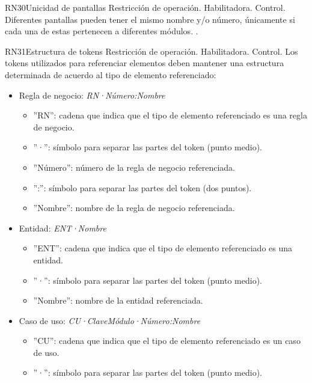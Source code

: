 \begin{BussinesRule}{RN30}{Unicidad de pantallas} 
	\BRitem[Tipo:] Restricción de operación. 
	\BRitem[Clase:] Habilitadora. 
	\BRitem[Nivel:] Control. %
	\BRitem[Descripción:] Diferentes pantallas pueden tener el mismo nombre y/o número, únicamente si cada una de estas pertenecen a diferentes módulos.
	 \UCref{}{}. 
\end{BussinesRule}

\begin{BussinesRule}{RN31}{Estructura de tokens} 
	\BRitem[Tipo:] Restricción de operación. 
	\BRitem[Clase:] Habilitadora. 
	\BRitem[Nivel:] Control. %
	\BRitem[Descripción:] Los tokens utilizados para referenciar elementos deben mantener una estructura determinada de acuerdo al tipo de elemento referenciado:
	\begin{itemize}
		\item Regla de negocio: {\em RN·Número:Nombre}
		\begin{itemize}
			\item ''RN'': cadena que indica que el tipo de elemento referenciado es una regla de negocio.
			\item ''·'': símbolo para separar las partes del token (punto medio).
			\item ''Número'': número de la regla de negocio referenciada.
			\item '':'': símbolo para separar las partes del token (dos puntos).
			\item ''Nombre'': nombre de la regla de negocio referenciada.
		\end{itemize}
		\item Entidad: {\em ENT·Nombre}
		\begin{itemize}
			\item ''ENT'': cadena que indica que el tipo de elemento referenciado es una entidad.
			\item ''·'': símbolo para separar las partes del token (punto medio).
			\item ''Nombre'': nombre de la entidad referenciada.
		\end{itemize}
		\item Caso de uso: {\em CU·ClaveMódulo·Número:Nombre}
		\begin{itemize}
			\item ''CU'': cadena que indica que el tipo de elemento referenciado es un caso de uso.
			\item ''·'': símbolo para separar las partes del token (punto medio).

\end{itemize}
\end{itemize}
\end{BussinesRule}
